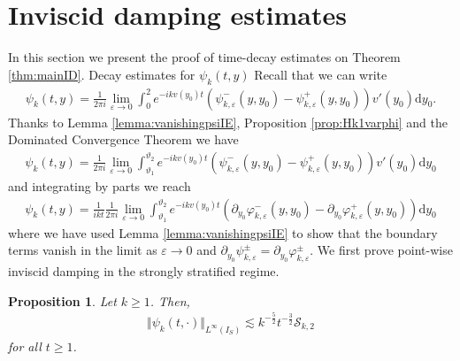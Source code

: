\documentclass[11pt,reqno]{amsproc}
\makeatletter
\renewcommand\subsection{\@startsection{subsection}{2}%
\normalparindent{.5\linespacing\@plus.7\linespacing}{-.5em}
{\normalfont\bfseries}}
\newtheorem{proposition}{Proposition}[section]
\theoremstyle{definition}
\numberwithin{equation}{section}
\newcommand{\cS}{{\mathcal S}}
\renewcommand{\d}{\mathrm{d}}
\newcommand{\ep}{\varepsilon}
\makeatother
\begin{document}
\section{Inviscid damping estimates}\label{sec:IDestimates}
In this section we present the proof of time-decay estimates on Theorem \ref{thm:mainID}. 
\subsection{Decay estimates for $\psi_k(t,y)$}
Recall that we can write
\begin{align*}
\psi_k(t,y) = \frac{1}{2\pi i }\lim_{\ep\rightarrow 0}\int_0^2 e^{-ikv(y_0) t} \left( \psi_{k,\ep}^-(y,y_0) - \psi_{k,\ep}^+(y,y_0) \right) v'(y_0) \d y_0.
\end{align*}
Thanks to Lemma \ref{lemma:vanishingpsiIE}, Proposition \ref{prop:Hk1varphi} and the Dominated Convergence Theorem we have
\begin{align}\label{eq:psioscint}
\psi_k(t,y) = \frac{1}{2\pi i }\lim_{\ep\rightarrow 0}\int_{\vartheta_1}^{\vartheta_2} e^{-ikv(y_0) t} \left( \psi_{k,\ep}^-(y,y_0) - \psi_{k,\ep}^+(y,y_0) \right) v'(y_0) \d y_0
\end{align}
and integrating by parts we reach
\begin{align*}
\psi_k(t,y) = \frac{1}{ikt}\frac{1}{2\pi i }\lim_{\ep\rightarrow 0}\int_{\vartheta_1}^{\vartheta_2} e^{-ikv(y_0) t} \left( \partial_{y_0}\varphi_{k,\ep}^-(y,y_0) - \partial_{y_0}\varphi_{k,\ep}^+(y,y_0) \right)  \d y_0
\end{align*}
where we have used Lemma \ref{lemma:vanishingpsiIE} to show that the boundary terms vanish in the limit as $\ep\rightarrow 0$ and $\partial_{y_0}\psi_{k,\ep}^\pm = \partial_{y_0}\varphi_{k,\ep}^\pm$. We first prove point-wise inviscid damping in the strongly stratified regime.

\begin{proposition}\label{prop:IDpsistrong}
Let $k\geq 1$. Then,
\begin{align*}
\Vert \psi_k(t,\cdot) \Vert_{L^\infty(I_S)}  \lesssim k^{-\frac52} t^{-\frac32}\cS_{k,2}
\end{align*}
for all $t\geq 1$.
\end{proposition}
\end{document}

